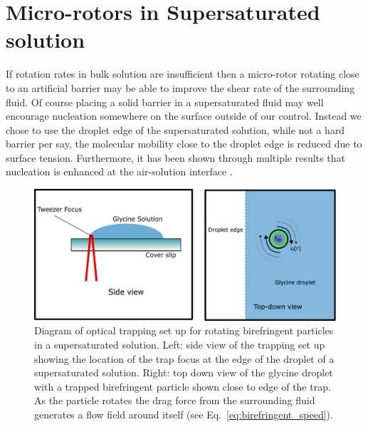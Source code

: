 \section{Micro-rotors in Supersaturated solution}
If rotation rates in bulk solution are insufficient then a micro-rotor rotating
close to an artificial barrier may be able to improve the shear rate of the 
surrounding fluid. Of course placing a solid barrier in a supersaturated fluid
may well encourage nucleation somewhere on the surface outside of our control.
Instead we chose to use the droplet edge of the supersaturated solution, while
not a hard barrier per say, the molecular mobility close to the droplet edge is
reduced due to surface tension. Furthermore, it has been shown through multiple 
results that nucleation is enhanced at the air-solution interface \cite{Liao2022,
Yuyama2010, Sugiyama2009}. 
\begin{figure}[h!]
	\centering
	\includegraphics[width=\linewidth]{vaterite_diagram.pdf}
	\caption{Diagram of optical trapping set up for rotating birefringent 
		particles in a supersaturated solution. Left: side view of the 
		trapping set up showing the location of the trap focus at the 
		edge of the droplet of a supersaturated solution. Right: top down 
		view of the glycine droplet with a trapped birefringent particle 
		shown close to edge of the trap. As the particle rotates the drag 
		force from the surrounding fluid generates a flow field around 
		itself (see Eq.~\ref{eq:birefringent_speed}).}
\end{figure}


